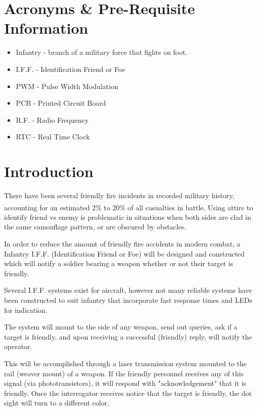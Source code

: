 \documentclass[openbib,letterpaper,10pt]{article}
\newcommand{\buildtoc}{
	\clearpage
	\singlespacing
	\tableofcontents
	\onehalfspacing
}
\begin{document}
\maketitle
\pagestyle{fancy}
\begin{spacing}{1.15}


\color{black}
\buildtoc
{}
\section*{Acronyms \& Pre-Requisite Information}
\begin{itemize}
	\item Infantry - branch of a military force that fights on foot.
	\item I.F.F. - Identification Friend or Foe
	\item PWM - Pulse Width Modulation
	\item PCB - Printed Circuit Board
	\item R.F. - Radio Frequency
	\item RTC - Real Time Clock
\end{itemize}
\clearpage
\setcounter{page}{1}

\section{Introduction}
There have been several friendly fire incidents in recorded military history, accounting for an estimated 2\% to 20\% of all casualties in battle\textsuperscript{\cite{USArmy}}. Using attire to identify friend vs enemy is problematic in situations when both sides are clad in the same camouflage pattern, or are obscured by obstacles.

In order to reduce the amount of friendly fire accidents in modern combat, a Infantry I.F.F. (Identification Friend or Foe) will be designed and constructed which will notify a soldier bearing a weapon whether or not their target is friendly.

Several I.F.F. systems exist for aircraft, however not many reliable systems have been constructed to suit infantry that incorporate fast response times and LEDs for indication.

The system will mount to the side of any weapon, send out queries, ask if a target is friendly, and upon receiving a successful (friendly) reply, will notify the operator.

This will be accomplished through a laser transmission system mounted to the rail (weaver mount) of a weapon. If the friendly personnel receives any of this signal (via phototransistors), it will respond with "acknowledgement" that it is friendly. Once the interrogator receives notice that the target is friendly, the dot sight will turn to a different color.


\end{spacing}
\end{document}
